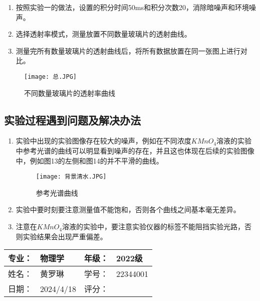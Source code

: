 \documentclass[dvipsnames, svgnames,a4paper,11pt]{article}
\begin{document}
\begin{enumerate}
			\begin{enumerate}
				\item 按照实验一的做法，设置的积分时间50ms和积分次数20，消除暗噪声和环境噪声。
				
				\item 选择透射率模式，测量放置不同数量玻璃片的透射曲线。
				
				\item 测量完所有数量玻璃片的透射曲线后，将所有数据放置在同一张图上进行对比。
				
			\end{enumerate}
			\begin{figure}[{H}]
				\centering
				\texttt{[image: 总.JPG]}
				\caption{不同数量玻璃片的透射率曲线}
				\label{}
			\end{figure}

	\end{enumerate}
	
	


	
	\subsection{实验过程遇到问题及解决办法}
	\begin{enumerate}
		\item 实验中出现的实验图像存在较大的噪声，例如在不同浓度$KMnO_4$溶液的实验中参考光谱的曲线可以明显看到噪声的存在，并且这也体现在后续的实验图像中，例如图13的左侧和图14的并不平滑的曲线。
		\begin{figure}[{H}]
			\centering
			\texttt{[image: 背景清水.JPG]}
			\caption{参考光谱曲线}
			\label{}
		\end{figure}
		\item 实验中要时刻要注意测量值不能饱和，否则各个曲线之间基本毫无差异。
		\item 注意在$KMnO_4$溶液的实验中，要注意实验仪器的标签不能阻挡实验光路，否则实验结果会出现严重偏差。
	\end{enumerate}
	
	
	
	\clearpage
	
	\begin{table}
		\renewcommand\arraystretch{1.7}
		\begin{tabularx}{\textwidth}{|X|X|X|X|}
			\hline
			专业：& 物理学 &年级：& 2022级\\
			\hline
			姓名： & 黄罗琳 & 学号：& 22344001\\
			\hline
			日期：& 2024/4/18 & 评分： &\\
			\hline
		\end{tabularx}
	\end{table}
	
\end{document}
